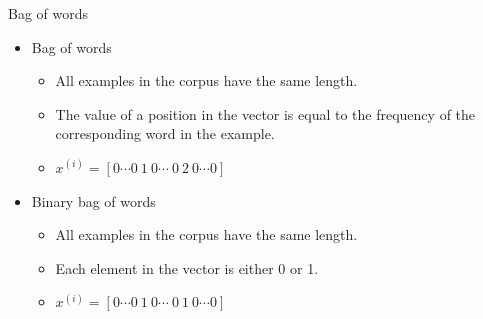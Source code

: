 \documentclass{beamer}
\begin{document}
\begin{frame}[fragile]{Bag of words}
\begin{itemize}
	\item Bag of words
	\begin{itemize}
		\item All examples in the corpus have the same length. 
		\item The value of a position in the vector is equal to the frequency of the corresponding word in the example.
		\item $x^{(i)}=[0\cdots0~1~0\cdots~0~2~0\cdots0]$
	\end{itemize}
	\item Binary bag of words
	\begin{itemize}
		\item All examples in the corpus have the same length. 
		\item Each element in the vector is either 0 or 1.
		\item $x^{(i)}=[0\cdots0~1~0\cdots~0~1~0\cdots0]$
	\end{itemize}
\end{itemize}
\end{frame}
\end{document}
